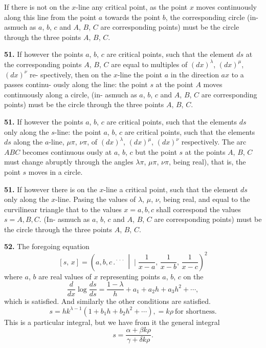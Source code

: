 \documentclass[11pt]{article}
\newcommand{\artno}[1]{\textbf{#1.}\quad}
\begin{document}
If there is not on the $x$-line any critical point, as the point $x$ moves continuously along this line from the point $a$ towards the point $b$, the corresponding circle (in-
asmuch as $a$, $b$, $c$ and $A$, $B$, $C$ are corresponding points) must be the circle through
the three points $A$, $B$, $C$.

\artno{51} If however the points $a$, $b$, $c$ are critical points, such that the element $ds$
at the corresponding points $A$, $B$, $C$ are equal to multiples of $(dx)^{\lambda}$, $(dx)^{\mu}$, $(dx)^{\nu}$ re-
spectively, then on the $x$-line the point $a$ in the direction $ax$ to a passes continu-
ously along the line: the point $s$ at the point $A$ moves continuously along a circle, (in-
asmuch as $a$, $b$, $c$ and $A$, $B$, $C$ are corresponding points) must be the circle through
the three points $A$, $B$, $C$.

\artno{51} If however the points $a$, $b$, $c$ are critical points, such that the elements $ds$
only along the $s$-line: the point $a$, $b$, $c$ are critical points, such that the elements $ds$
along the $a$-line, $\mu\pi$, $\nu\pi$, of $(dx)^{\lambda}$, $(dx)^{\mu}$, $(dx)^{\nu}$ respectively. The arc $ABC$ becomes continuous
ously at $a$, $b$, $c$ but the point $s$ at the points $A$, $B$, $C$ must change abruptly through
the angles $\lambda\pi$, $\mu\pi$, $\nu\pi$, being real), that is, the point $s$ moves in a circle.

\artno{51} If however there is on the $x$-line a critical point, such that the element $ds$
only along the $x$-line. Pasing the values of $\lambda$, $\mu$, $\nu$, being real, and equal to the curvilinear triangle
that to the values $x = a, b, c$ shall correspond the values $s = A, B, C$. (In-
asmuch as $a$, $b$, $c$ and $A$, $B$, $C$ are corresponding points) must be the circle through
the three points $A$, $B$, $C$.

\artno{52} The foregoing equation
\[
   [s,\,x] = \left(a, b, c \,.{}^{\!\cdot\!\cdot\!\cdot}\,\middle|\!\!\!\mid \frac{1}{x-a},\,\frac{1}{x-b},\,\frac{1}{x-c}\right)^{\!2}
\]
where $a$, $b$ are real values of $x$ representing points $a$, $b$, $c$ on the
\[
   \frac{d}{dx}\log\frac{ds}{ds} = \frac{1 - \lambda}{h} + a_{1} + a_{2}h + a_{3}h^{2} + \cdots,
\]
which is satisfied. And similarly the other conditions are satisfied.
\[
   s = h k^{\lambda-1}(1 + b_{1}h + b_{2}h^{2} + \cdots), = k\rho\ \text{for shortness.}
\]
This is a particular integral, but we have from it the general integral
\[
   s = \frac{\alpha + \beta k\rho}{\gamma + \delta k\rho}.
\]
\end{document}
